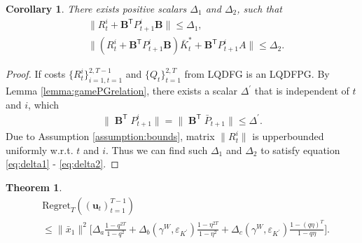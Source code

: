 \documentclass{article}
\newcommand{\transpose}{\mathsf{T}}
\DeclareMathOperator{\contB}{\mathbf{B}}
\newtheorem{corollary}{Corollary}
\newtheorem{theorem}{Theorem}
\begin{document}
\begin{corollary}\label{corollary:Delta}
    There exists positive scalars $\Delta_{1}$ and $\Delta_{2}$, such that
    \begin{align}
    \label{eq:delta1}
        &\|R_{t}^{i}+\mathbf{B}^{\transpose}P_{t+1}^{i}\mathbf{B}\| \leq \Delta_{1},\\
        \label{eq:delta2}
        &\|(R_{t}^{i}+\mathbf{B}^{\transpose}P_{t+1}^{i}\mathbf{B})\bar{K}_{t}^{*}+\mathbf{B}^{\transpose}P_{t+1}^{i}A\| \leq \Delta_{2}.
    \end{align}
\end{corollary}
\begin{proof}
    If costs $\{R_{t}^{i}\}_{i=1,t=1}^{2,T-1}$ and $\{Q_{t}\}_{t=1}^{2,T}$ from LQDFG is an LQDFPG. By Lemma \ref{lemma:gamePGrelation}, there exists a scalar $\Delta^{'}$ that is independent of $t$ and $i$, which
    \begin{align*}
        \|\contB^{\transpose}P_{t+1}^{i}\| = \|\contB^{\transpose}\bar{P}_{t+1}\| \leq \Delta^{'}.
    \end{align*}
    Due to Assumption \ref{assumption:bounds}, matrix $\|R_{t}^{i}\|$ is upperbounded uniformly w.r.t. $t$ and $i$. Thus we can find such $\Delta_{1}$ and $\Delta_{2}$ to satisfy equation \eqref{eq:delta1} - \eqref{eq:delta2}.
\end{proof}


\begin{theorem}
    \begin{align*}
        &\text{Regret}_{T}((\mathbf{u}_{t})_{t=1}^{T-1})\\
        &\leq \|\bar{x}_{1}\|^{2}\bigg[\Delta_{a}\frac{1-q^{2T}}{1-q^{2}} +  \Delta_{b}(\gamma^{W},\varepsilon_{K^{'}})\frac{1-\eta^{2T}}{1-\eta^{2}}+ \Delta_{c}(\gamma^{W},\varepsilon_{K^{'}})\frac{1-(q\eta)^{T}}{1-q\eta}\bigg].
    \end{align*}
\end{theorem}
\end{document}
